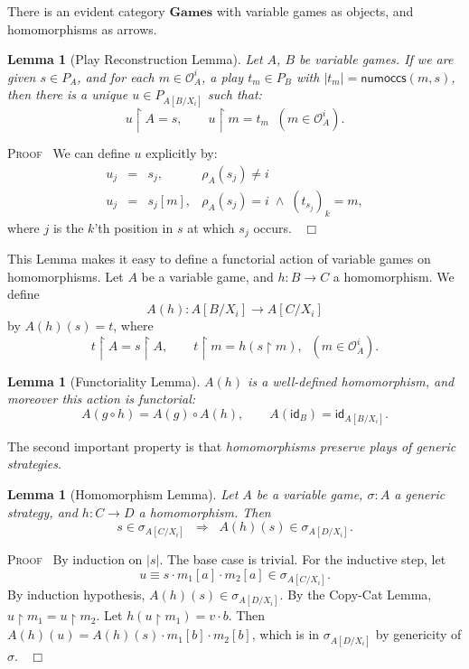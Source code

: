 \documentclass[a4paper,11pt]{article}
\newtheorem{lemma}[proposition]{Lemma}
\newcommand{\GasS}{\mathbf{Games}}
\newcommand{\numoccs}[2]{\mathsf{numoccs}(#1 , #2 )}
\newcommand{\restrict}{{\upharpoonright}}
\newcommand{\Occ}{\mathcal{O}}
\newcommand{\ident}{\mathsf{id}}
\newenvironment{proof}{\textsc{Proof}\ }{$\;\; \Box$}
\begin{document}
There is an evident category $\GasS$ with  variable games as objects, and
homomorphisms as arrows.

\begin{lemma}[Play Reconstruction Lemma]
Let $A$, $B$ be variable games. If we are given $s \in P_A$,
and for each $m \in \Occ_A^i$, a play $t_m \in P_B$ with $|t_m | = \numoccs{m}{s}$,
then there is a unique $u \in P_{A[B/X_{i}]}$ such
  that:
\[ u \restrict A = s, \qquad u \restrict m = t_m  \;\; (m \in \Occ_A^i )
. \]
\end{lemma}
\begin{proof}
We can define $u$ explicitly by:
\[ \begin{array}{lcll}
u_j & = & s_j , & \rho_{A} (s_j ) \neq i \\
u_j & = & s_{j}[m], & \rho_{A} (s_j ) = i \; \wedge \; (t_{s_j})_k =
m,
\end{array} \]
where $j$ is the $k$'th position in $s$ at which $s_j$ occurs.
\end{proof}

This Lemma makes it easy to define a functorial action of variable
games on homomorphisms. Let  $A$ be a variable game, and $h : B
\longrightarrow C$ a homomorphism.
We define
\[ A(h) : A[B/X_{i}] \longrightarrow A[C/X_{i}] \]
by
$A(h)(s) = t$,
where
\[ t \restrict A = s \restrict A, \qquad t \restrict m = h ( s
\restrict m), \;\; (m \in \Occ_A^i ) . \]

\begin{lemma}[Functoriality Lemma]
$A(h)$ is a well-defined homomorphism, and moreover this action is
functorial:
\[ A(g \circ h) = A(g) \circ A(h), \qquad A(\ident_{B}) =
\ident_{A[B/X_{i}]} . \]
\end{lemma}

\noindent The second important property is that \emph{homomorphisms preserve plays of
generic strategies}.

\begin{lemma}[Homomorphism Lemma]
Let $A$ be a variable game,  $\sigma : A$ a generic strategy, and $h : C
\longrightarrow D$ a homomorphism. Then
\[ s \in \sigma_{A[C/X_{i}]} \;\; \Longrightarrow \;\; A(h)(s) \in
  \sigma_{A[D/X_{i}]} . \]
\end{lemma}
\begin{proof}
By induction on $|s|$. The base case is trivial. For the inductive
step, let
\[ u \equiv s \cdot m_1[a] \cdot m_2[a] \in \sigma_{A[C/X_{i}]}
. \]
By induction hypothesis, $A(h)(s) \in \sigma_{A[D/X_{i}]}$.
By the Copy-Cat Lemma, $u \restrict m_1 = u \restrict m_2$. Let $h(u
\restrict m_1 ) = v \cdot b$. Then
$A(h)(u) = A(h)(s) \cdot m_{1}[b] \cdot m_{2}[b]$, which is in
$\sigma_{A[D/X_{i}]}$ by genericity of $\sigma$.
\end{proof}
\end{document}
